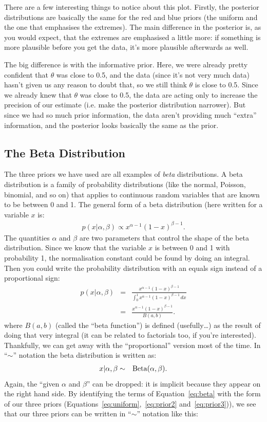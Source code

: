 There are a few interesting things to notice about this plot. Firstly, the
posterior distributions are basically the same for the red and blue priors (the
uniform and the one that emphasises the extremes). The main difference in the
posterior is, as you would expect, that the extremes are emphasised a little
more: if something is more plausible before you get the data, it's more
plausible afterwards as well.

The big difference is with the informative prior. Here, we were already pretty
confident that $\theta$ was close to 0.5, and the data (since it's not very
much data) hasn't given us any reason to doubt that, so we still think $\theta$
is close to 0.5. Since we already knew that $\theta$ was close to 0.5, the data
are acting only to increase the precision of our estimate (i.e. make the
posterior distribution narrower). But since we had so much prior information,
the data aren't providing much ``extra'' information, and the posterior looks
basically the same as the prior.

\subsection{The Beta Distribution}
The three priors we have used are all examples of {\it beta} distributions. A beta
distribution is a family of probability distributions (like the normal, Poisson,
binomial, and so on) that applies to continuous random variables that are known
to be between 0 and 1. The general form of a beta distribution (here written
for a variable $x$ is:
\begin{eqnarray}
p(x|\alpha, \beta) \propto x^{\alpha - 1}(1 - x)^{\beta - 1}\label{eq:beta}.
\end{eqnarray}
The quantities $\alpha$ and $\beta$ are two parameters that control the shape
of the beta distribution. Since we know that the variable $x$ is between 0 and 1 with probability 1, the
normalisation constant could be found by doing an integral. Then you could write
the probability distribution with an equals sign instead of a proportional sign:
\begin{eqnarray}
p(x|\alpha, \beta) &=& \frac{x^{\alpha - 1}(1 - x)^{\beta - 1}}
{\int_0^1 x^{\alpha - 1}(1 - x)^{\beta - 1} \, dx}\\
&=& \frac{x^{\alpha - 1}(1 - x)^{\beta - 1}}
{B(a, b)}.
\end{eqnarray}
where $B(a, b)$ (called the ``beta function'') is defined (usefully\ldots) as the
result of doing that very integral (it can be related to factorials too, if you're interested).
Thankfully, we can get away with the ``proportional'' version most of the time.
In ``$\sim$'' notation the beta distribution is written as:
\begin{eqnarray}
x|\alpha, \beta &\sim& \textnormal{Beta}(\alpha, \beta).
\end{eqnarray}
Again, the ``given $\alpha$ and $\beta$'' can be dropped: it is implicit because
they appear on the right hand side. By identifying the terms of
Equation~\ref{eq:beta} with the form of our three priors (Equations~\ref{eq:uniform},~\ref{eq:prior2} and~\ref{eq:prior3})),
we see that our three priors can be written in ``$\sim$'' notation like this:


